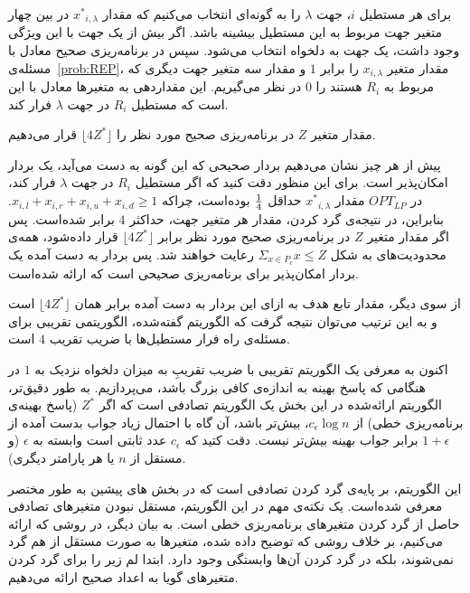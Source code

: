
 برای هر مستطیل $i$، جهت $\lambda$ را به گونه‌ای انتخاب می‌کنیم که مقدار ${x^{*}}_{i, \lambda}$ در بین چهار متغیر‌ جهت مربوط به این مستطیل بیشینه باشد. اگر بیش از یک جهت با این ویژگی وجود داشت، یک جهت به دلخواه انتخاب می‌شود. سپس در برنامه‌ریزی صحیح معادل با مسئله‌ی~\ref{prob:REP}، مقدار متغیر $x_{i, \lambda}$ را برابر $1$ و مقدار سه متغیر جهت دیگری که مربوط به $R_{i}$ هستند را $0$ در نظر می‌گیریم. این مقدار‌دهی به متغیر‌ها معادل با این است که مستطیل $R_{i}$ در جهت $\lambda$ فرار کند.

 مقدار متغیر $Z$ در برنامه‌ریزی صحیح مورد نظر را $\lfloor {4 {Z^{*}}} \rfloor$ قرار می‌دهیم.


پیش از هر چیز نشان می‌دهیم بردار صحیحی که این گونه به دست می‌آید، یک بردار امکان‌پذیر است. برای این منظور دقت کنید که اگر مستطیل $R_{i}$ در جهت $\lambda$ فرار کند،  در $OPT_{LP}$ مقدار ${x^{*}}_{i, \lambda}$ حد‌اقل ${{1} \over {4}}$ بوده‌است، چراکه $x_{i, l} + x_{i, r} + x_{i, u} + x_{i, d} \geq 1$. بنابراین، در نتیجه‌ی گرد کردن، مقدار هر متغیر جهت، حد‌اکثر $4$ برابر شده‌است. پس اگر مقدار متغیر $Z$ در برنامه‌ریزی صحیح مورد نظر برابر $\lfloor {4 {Z^{*}}} \rfloor$ قرار داده‌شود، همه‌ی محدودیت‌های به شکل $\Sigma_{x \in P_{c}} x \leq Z$ رعایت خواهند شد. پس بردار به دست آمده یک بردار امکان‌پذیر برای برنامه‌ریزی صحیحی است که ارائه شده‌است.

از سوی دیگر، مقدار تابع هدف به ازای این بردار به دست آمده برابر همان $\lfloor {4 {Z^{*}}} \rfloor$ است و به این ترتیب می‌توان نتیجه گرفت که الگوریتم گفته‌شده، الگوریتمی تقریبی برای مسئله‌ی راه فرار مستطیل‌ها با ضریب تقریب $4$ است.


اکنون به معرفی یک الگوریتم تقریبی با ضریب تقریبِ به میزان دلخواه نزدیک به $1$ در هنگامی که پاسخ بهینه به اندازه‌ی کافی بزرگ باشد، می‌پردازیم. به طور دقیق‌تر، الگوریتم ارائه‌شده در این بخش یک الگوریتم تصادفی است که اگر $Z^{*}$ (پاسخ بهینه‌ی برنامه‌ریزی خطی) از  $c_\epsilon \log n$، بیش‌تر باشد، آن گاه با احتمال زیاد جواب بدست آمده از $1 + \epsilon$ برابر جواب بهینه بیش‌تر نیست. دقت کتید که $c_{\epsilon}$ عدد ثابتی است وابسته به $\epsilon$ (و مستقل از $n$ یا هر پارامتر دیگری).

این الگوریتم، بر پایه‌ی گرد کردن تصادفی است که در بخش های پیشین به طور مختصر معرفی شده‌است. یک نکته‌ی مهم در این الگوریتم، مستقل نبودن متغیرهای تصادفی حاصل از گرد کردن متغیرهای برنامه‌ریزی خطی است. به بیان دیگر، در روشی که ارائه می‌کنیم، بر خلاف روشی که توضیح داده شده، متغیر‌ها به صورت مستقل از هم گرد نمی‌شوند، بلکه در گرد کردن آن‌ها وابستگی وجود دارد. ابتدا لم زیر را برای گرد کردن متغیرهای گویا به اعداد صحیح ارائه می‌دهیم.

